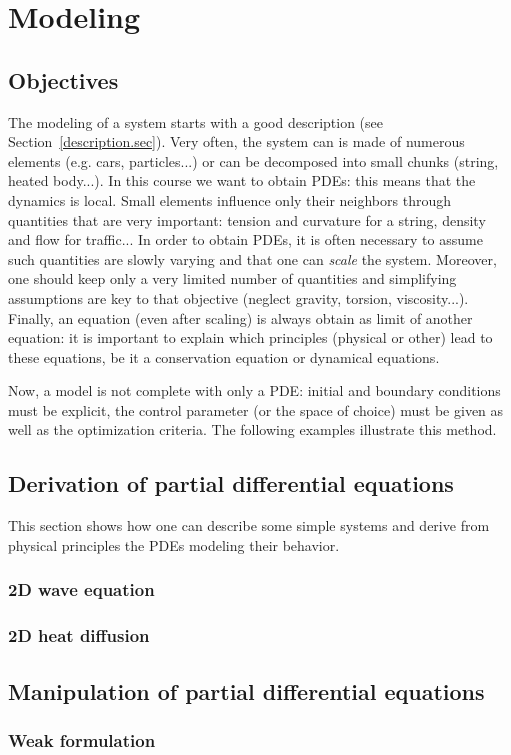 \thispagestyle{empty}
\chapter{Modeling}
\label{modeling.chap}

\section{Objectives}

The modeling of a system starts with a good description (see Section~\ref{description.sec}). Very often, the system can is made of numerous elements (e.g. cars, particles...) or can be decomposed into small chunks (string, heated body...). In this course we want to obtain PDEs: this means that the dynamics is local. Small elements influence only their neighbors through quantities that are very important: tension and curvature for a string, density and flow for traffic... In order to obtain PDEs, it is often necessary to assume such quantities are slowly varying and that one can \emph{scale} the system. Moreover, one should keep only a very limited number of quantities and simplifying assumptions are key to that objective (neglect gravity, torsion, viscosity...). Finally, an equation (even after scaling) is always obtain as limit of another equation: it is important to explain which principles (physical or other) lead to these equations, be it a conservation equation or dynamical equations.

Now, a model is not complete with only a PDE: initial and boundary conditions must be explicit, the control parameter (or the space of choice) must be given as well as the optimization criteria. The following examples illustrate this method. 

\section{Derivation of partial differential equations}
This section shows how one can describe some simple systems and derive from physical principles the PDEs modeling their behavior.

\subsection{2D wave equation}


\subsection{2D heat diffusion}



\section{Manipulation of partial differential equations}

\subsection{Weak formulation}

